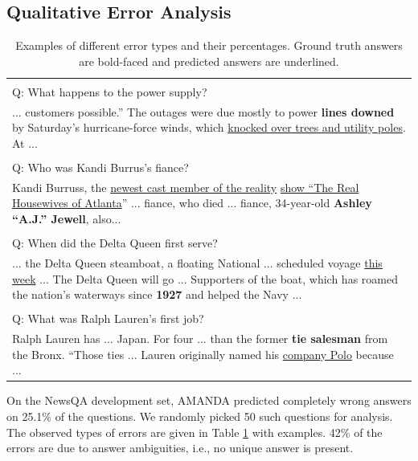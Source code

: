 \documentclass[letterpaper]{article} %
\begin{document}
\subsection{Qualitative Error Analysis}
\label{sec:qual_error_analysis}
\begin{table}[t]
\centering
\begin{tabular}{|p{8.0cm}|}
\hline
\noindent{Answer ambiguity (42\%)} \\
Q: What happens to the power supply? \\
... customers possible.'' The outages were due mostly to power \textbf{lines downed} by Saturday's hurricane-force winds, which \underline{knocked over trees and utility poles}. At  ... \\ \hline
\noindent{Context mismatch (22\%)} \\
Q: Who was Kandi Burrus's fiance? \\
Kandi Burruss, the \underline{newest cast member of the reality} \underline{show ``The Real Housewives of Atlanta}'' ... fiance, who died ... fiance, 34-year-old \textbf{Ashley ``A.J.'' Jewell}, also... \\
\hline
\noindent{Complex inference (10\%)} \\
Q: When did the Delta Queen first serve? \\
...  the Delta Queen steamboat, a floating National ... scheduled voyage \underline{this week} ... The Delta Queen will go ... Supporters of the boat, which has roamed the nation's waterways since \textbf{1927} and helped the Navy ... \\
\hline
\noindent{Paraphrasing issues (6\%)} \\
Q: What was Ralph Lauren's first job? \\
Ralph Lauren has ... Japan. For four ... than the former \textbf{tie salesman} from the Bronx. ``Those ties ... Lauren originally named his \underline{company Polo} because ... \\
\hline
\end{tabular}
\caption{Examples of different error types and their percentages. Ground truth answers are bold-faced and predicted answers are underlined.}
\label{tab:qual_analysis}
\end{table}
On the NewsQA development set, AMANDA predicted completely wrong answers on 25.1\% of the questions. We randomly picked 50 such questions for analysis. The observed types of errors are given in Table \ref{tab:qual_analysis} with examples. 42\% of the errors are due to answer ambiguities, i.e., no unique answer is present.
\end{document}
